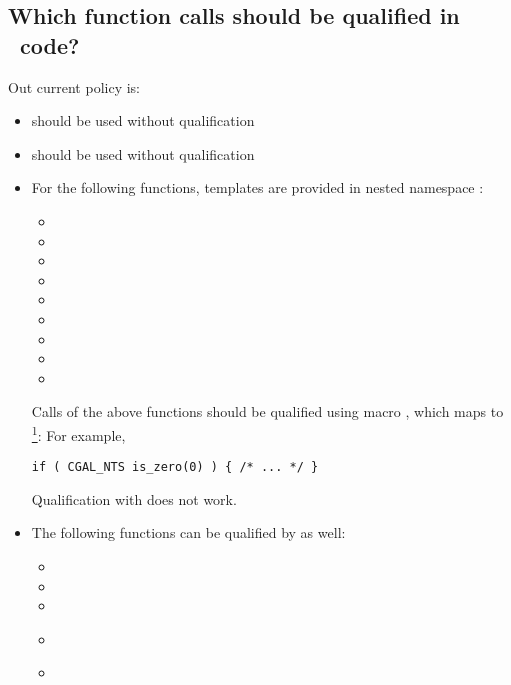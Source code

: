 \subsection{Which function calls should be qualified in \cgal\ code?}
Out current policy is:
\begin{itemize}
\item
{} should be used without qualification
\item
{} should be used without qualification
\item
For the following functions, templates are provided in nested namespace
:
\begin{itemize}
\item[]
\item[]
\item[]
\item[]
\item[]
\item[]
\item[]
\item[]
\item[]
\end{itemize}
Calls of the above functions should be qualified using macro 
,%
which maps to \footnote{The use of
the macro eases future changes in our policy.}: For example,
\begin{verbatim}
if ( CGAL_NTS is_zero(0) ) { /* ... */ } 
\end{verbatim}
Qualification with  does not work.
\item
The following functions can be qualified by  as well:
\begin{itemize} 
\item[]
\item[]
\item[]
\item[]\\
\item[]\\
Whenever the argument of  is a concrete type, \ie, it does
not depend on a template parameter, you should qualify the call of
, for example \verb+CGAL_CLIB_STD::sqrt(2.0)+
\end{itemize}
Here, qualification with  works as well.
\end{itemize}
Summarizing, you can always qualify functions on number types
with  besides  and .

